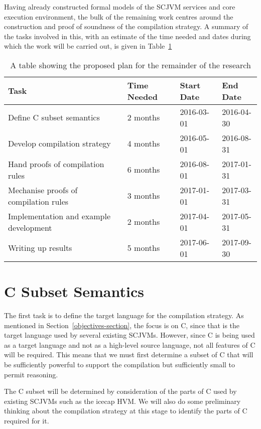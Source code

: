 \documentclass[a4paper,10pt]{report}
\begin{document}
Having already constructed formal models of the SCJVM services and
core execution environment, the bulk of the remaining work centres
around the construction and proof of soundness of the compilation
strategy.
A summary of the tasks involved in this, with an estimate of the time
needed and dates during which the work will be carried out, is given
in Table~\ref{research-plan-table}

\begin{table}[ht]
  \centering
  \begin{tabular}{llll}
    \hline
    Task & Time Needed & Start Date & End Date  \\
    \hline
    Define C subset semantics & 2 months & 2016-03-01 & 2016-04-30 \\
    Develop compilation strategy & 4 months & 2016-05-01 & 2016-08-31 \\
    Hand proofs of compilation rules & 6 months & 2016-08-01 & 2017-01-31 \\
    Mechanise proofs of compilation rules & 3 months & 2017-01-01 & 2017-03-31 \\
    Implementation and example development & 2 months & 2017-04-01 & 2017-05-31 \\
    Writing up results & 5 months & 2017-06-01 & 2017-09-30 \\
    \hline
  \end{tabular}
  \caption{A table showing the proposed plan for the remainder of the research}
  \label{research-plan-table}
\end{table}

\section{C Subset Semantics}

The first task is to define the target language for the compilation
strategy.
As mentioned in Section~\ref{objectives-section}, the focus is on C,
since that is the target language used by several existing SCJVMs.
However, since C is being used as a target language and not as a
high-level source language, not all features of C will be required.
This means that we must first determine a subset of C that will be
sufficiently powerful to support the compilation but sufficiently
small to permit reasoning.

The C subset will be determined by consideration of the parts of C
used by existing SCJVMs such as the icecap HVM.
We will also do some preliminary thinking about the compilation
strategy at this stage to identify the parts of C required for it.
\end{document}
